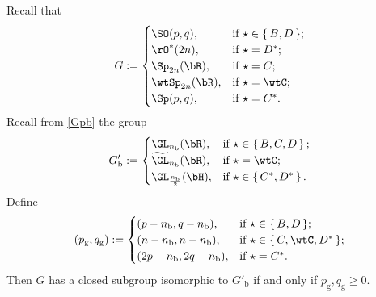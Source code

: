 \documentclass[12pt,a4paper]{amsart}
\numberwithin{equation}{section}
\theoremstyle{remark}
\def\Gpb{G'_{\mathrm b}}
\begin{document}
Recall that
\[
  G :=
  \begin{cases}
    \SO(p,q), & \textrm{if $\star\in \set{B,D}$};\\
    \rO^{*}(2n), &\textrm{if $\star = D^{*}$};\\
    \Sp_{2n}(\bR), &\textrm{if $\star = C$};\\
    \wtSp_{2n}(\bR), &\textrm{if $\star = \wtC$};\\
    \Sp(p,q), &\textrm{if $\star = C^{*}$}.\\
  \end{cases}
\]
Recall from \eqref{Gpb} the group
\[
  G'_{\mathrm b} := \begin{cases}
    \GL_{n_{\mathrm b}}(\bR), & \text{if } \star \in \set{B,C,D}; \\
    \widetilde{\GL}_{n_{\mathrm b}}(\bR), & \text{if } \star = \wtC; \\
    \GL_{\frac{n_{\mathrm b}}{2}}(\bH), & \text{if } \star \in \set{C^{*},D^{*}}.\\
  \end{cases}
\]
Define
\[
  (p_\mathrm g, q_\mathrm g) :=
  \begin{cases}
    (p-n_{\mathrm b},q-n_{\mathrm b}), & \textrm{if $\star\in \set{B,D}$};\\
    (n-n_{\mathrm b}, n-n_{\mathrm b}), &\textrm{if $\star \in \set{C, \wtC,D^{*}}$};\\
    (2p- n_{\mathrm b}, 2q-n_{\mathrm b}), &\textrm{if $\star = C^{*}$}.\\
  \end{cases}
\]
Then $G$ has a closed subgroup isomorphic to $\Gpb$ if and only if $p_\mathrm g, q_\mathrm g\geq 0$.
\end{document}
